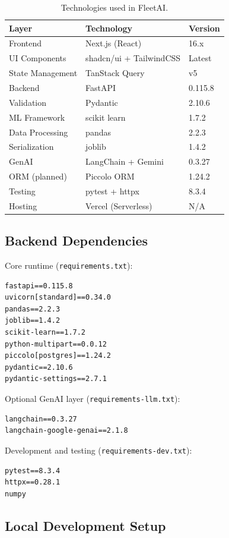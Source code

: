 \documentclass[conference]{IEEEtran}
\begin{document}
\begin{table}[H]
\centering
\caption{Technologies used in FleetAI.}
\label{tab:techstack}
\begin{tabular}{lll}
\toprule
Layer & Technology & Version \\
\midrule
Frontend & Next.js (React) & 16.x \\
UI Components & shadcn/ui + TailwindCSS & Latest \\
State Management & TanStack Query & v5 \\
Backend & FastAPI & 0.115.8 \\
Validation & Pydantic & 2.10.6 \\
ML Framework & scikit learn & 1.7.2 \\
Data Processing & pandas & 2.2.3 \\
Serialization & joblib & 1.4.2 \\
GenAI & LangChain + Gemini & 0.3.27 \\
ORM (planned) & Piccolo ORM & 1.24.2 \\
Testing & pytest + httpx & 8.3.4 \\
Hosting & Vercel (Serverless) & N/A \\
\bottomrule
\end{tabular}
\end{table}

\subsection{Backend Dependencies}

Core runtime (\texttt{requirements.txt}):
\begin{lstlisting}
fastapi==0.115.8
uvicorn[standard]==0.34.0
pandas==2.2.3
joblib==1.4.2
scikit-learn==1.7.2
python-multipart==0.0.12
piccolo[postgres]==1.24.2
pydantic==2.10.6
pydantic-settings==2.7.1
\end{lstlisting}

Optional GenAI layer (\texttt{requirements-llm.txt}):
\begin{lstlisting}
langchain==0.3.27
langchain-google-genai==2.1.8
\end{lstlisting}

Development and testing (\texttt{requirements-dev.txt}):
\begin{lstlisting}
pytest==8.3.4
httpx==0.28.1
numpy
\end{lstlisting}

\subsection{Local Development Setup}
\end{document}
